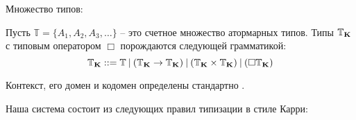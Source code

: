 \begin{defin} Множество типов:

Пусть $\mathbb{T} = \{ A_1, A_2, A_3, \dots \}$ -- это счетное множество атормарных типов. Типы $\mathbb{T}_{{\bf K}}$ с типовым оператором $\Box$ порождаются следующей грамматикой:
\begin{equation}
  \mathbb{T}_{{\bf K}} ::= \mathbb{T} \: | \: (\mathbb{T}_{{\bf K}} \to \mathbb{T}_{{\bf K}}) \: |
  \: (\mathbb{T}_{{\bf K}} \times \mathbb{T}_{{\bf K}}) \: | \: (\Box \mathbb{T}_{{\bf K}})
\end{equation}
\end{defin}

Контекст, его домен и кодомен определены стандартно \cite{Neder}\cite{Morten}.

Наша система состоит из следующих правил типизации в стиле Карри:

